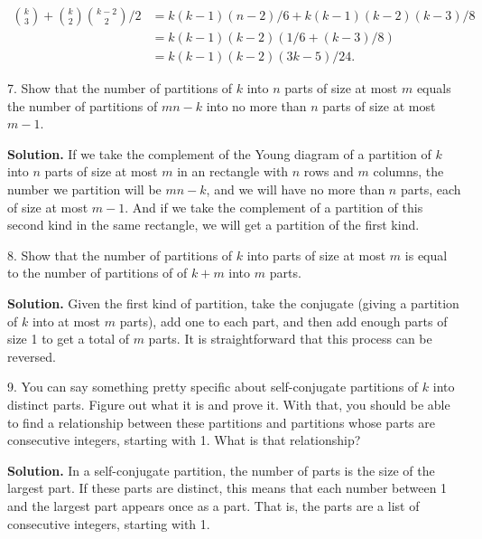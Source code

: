 \documentclass[10pt,]{book}
\theoremstyle{plain}
\theoremstyle{definition}
\theoremstyle{definition}
\numberwithin{equation}{chapter}
\begin{document}
\begin{exerciselist}
\begin{align*}
\binom{k}{3} + \binom{k}{2}\binom{k-2}{2}/2 &=
k(k-1)(n-2)/6 + k(k-1)(k-2)(k-3)/8\\
&= k(k-1)(k-2)(1/6 + (k-3)/8)\\
&= k(k-1)(k-2)(3k-5)/24\text{.}
\end{align*}
%
\item[7.]\hypertarget{exercise-29}{}Show that the number of partitions of \(k\) into \(n\) parts of size at most \(m\) equals the number of partitions of \(mn-k\) into no more than \(n\) parts of size at most \(m-1\).%
\par\smallskip
\par\smallskip
\noindent\textbf{Solution.}\hypertarget{solution-275}{}\quad
If we take the complement of the Young diagram of a partition of \(k\) into \(n\) parts of size at most \(m\) in an rectangle with \(n\) rows and \(m\) columns, the number we partition will be \(mn-k\), and we will have no more than \(n\) parts, each of size at most \(m-1\). And if we take the complement of a partition of this second kind in the same rectangle, we will get a partition of the first kind.%
\item[8.]\hypertarget{exercise-30}{}Show that the number of partitions of \(k\) into parts of size at most \(m\) is equal to the number of partitions of of \(k+m\) into \(m\) parts.%
\par\smallskip
\par\smallskip
\noindent\textbf{Solution.}\hypertarget{solution-276}{}\quad
Given the first kind of partition, take the conjugate (giving a partition of \(k\) into at most \(m\) parts), add one to each part, and then add enough parts of size 1 to get a total of \(m\) parts. It is straightforward that this process can be reversed.%
\item[9.]\hypertarget{exercise-31}{}You can say something pretty specific about self-conjugate partitions of \(k\) into distinct parts.  Figure out what it is and prove it.  With that, you should be able to find a relationship between these partitions and partitions whose parts are consecutive integers, starting with 1.  What is that relationship?%
\par\smallskip
\par\smallskip
\noindent\textbf{Solution.}\hypertarget{solution-277}{}\quad
In a self-conjugate partition, the number of parts is the size of the largest part. If these parts are distinct, this means that each number between 1 and the largest part appears once as a part. That is, the parts are a list of consecutive integers, starting with 1.%

\end{exerciselist}
\end{document}
